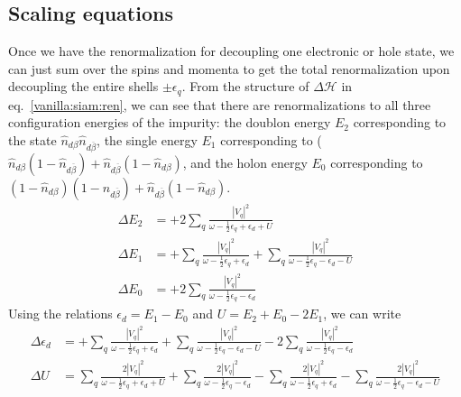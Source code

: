 \documentclass[twoside]{report}
\numberwithin{equation}{section}
\begin{document}
\subsection{Scaling equations}
Once we have the renormalization for decoupling one electronic or hole state, we can just sum over the spins and momenta to get the total renormalization upon decoupling the entire shells \(\pm \epsilon_q\). From the structure of \(\Delta \mathcal{H}\) in eq.~\ref{vanilla:siam:ren}, we can see that there are renormalizations to all three configuration energies of the impurity: the doublon energy \(E_2\) corresponding to the state  \(\hat n_{d\beta}\hat n_{d\overline\beta}\), the single energy \(E_1\) corresponding to (\(\hat n_{d\beta}(1 - \hat n_{d\overline\beta}) + \hat n_{d\overline\beta}(1 - \hat n_{d\beta})\), and the holon energy \(E_0\) corresponding to \((1 - \hat n_{d\beta})(1 - \hat n_{d\overline\beta}) + \hat n_{d\overline\beta}(1 - \hat n_{d\beta})\).
\begin{equation}\begin{aligned}
	\label{urg-siam}
	\Delta E_2 &= +2\sum_{q}\frac{|V_q|^2}{\omega - \frac{1}{2}\epsilon_q + \epsilon_d + U }\\
	\Delta E_1 &= +\sum_{q}\frac{|V_q|^2}{\omega - \frac{1}{2}\epsilon_q + \epsilon_d} + \sum_{q}\frac{|V_q|^2}{\omega - \frac{1}{2}\epsilon_q - \epsilon_d - U}\\
	\Delta E_0 &= +2\sum_{q}\frac{|V_q|^2}{\omega - \frac{1}{2}\epsilon_q - \epsilon_d}
\end{aligned}\end{equation}
Using the relations \(\epsilon_d = E_1 - E_0\) and \(U = E_2 + E_0 - 2E_1\), we can write
\begin{equation}\begin{aligned}
	\Delta \epsilon_d &= +\sum_{q}\frac{|V_q|^2}{\omega - \frac{1}{2}\epsilon_q + \epsilon_d} + \sum_{q}\frac{|V_q|^2}{\omega - \frac{1}{2}\epsilon_q - \epsilon_d - U} - 2\sum_{q}\frac{|V_q|^2}{\omega - \frac{1}{2}\epsilon_q - \epsilon_d}\\
	\Delta U &= \sum_{q}\frac{2|V_q|^2}{\omega - \frac{1}{2}\epsilon_q + \epsilon_d + U } + \sum_{q}\frac{2|V_q|^2}{\omega - \frac{1}{2}\epsilon_q - \epsilon_d} - \sum_{q}\frac{2|V_q|^2}{\omega - \frac{1}{2}\epsilon_q + \epsilon_d} - \sum_{q}\frac{2|V_q|^2}{\omega - \frac{1}{2}\epsilon_q - \epsilon_d - U}\\
\end{aligned}\end{equation}
\end{document}
